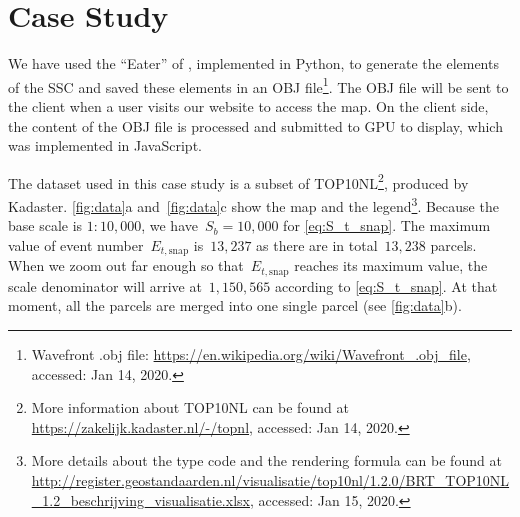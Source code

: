 \documentclass[ijgi,article,submit,moreauthors,pdftex]{Definitions/mdpi}
\begin{document}


\section{Case Study}

We have used the ``Eater'' of \citet{Suba2014Merge},
implemented in Python, 
to generate the elements of the SSC \citep{vanOosterom2014tGAPSSC} 
and saved these elements in an OBJ file\footnote{%
Wavefront .obj file:
\url{https://en.wikipedia.org/wiki/Wavefront_.obj_file},
accessed: Jan 14, 2020.}.
%
The OBJ file will be sent to the client 
when a user visits our website to access the map.
On the client side,
the content of the OBJ file is processed and submitted to GPU to display,
which was implemented in JavaScript.

The dataset used in this case study is a subset of TOP10NL\footnote{%
More information about TOP10NL can be found at
\url{https://zakelijk.kadaster.nl/-/topnl},
accessed: Jan 14, 2020.},
produced by Kadaster.
%
\figs\ref{fig:data}a and~\ref{fig:data}c show the map and the legend\footnote{%
More details about the type code and the rendering formula can be found at
\url{http://register.geostandaarden.nl/visualisatie/top10nl/1.2.0/BRT_TOP10NL_1.2_beschrijving_visualisatie.xlsx},
accessed: Jan 15, 2020.}.
%
Because the base scale is $1:10{,}000$, 
we have~$S_b = 10{,}000$ for \eq\ref{eq:S_t_snap}.
The maximum value of event number~$E_{t,\mathrm{snap}}$ is~$13{,}237$
as there are in total~$13{,}238$ parcels.
When we zoom out far enough 
so that~$E_{t,\mathrm{snap}}$ reaches its maximum value,
the scale denominator will arrive at~$1{,}150{,}565$
according to \eq\ref{eq:S_t_snap}.
At that moment, all the parcels are merged into one single parcel
(see \figs\ref{fig:data}b).
\end{document}
